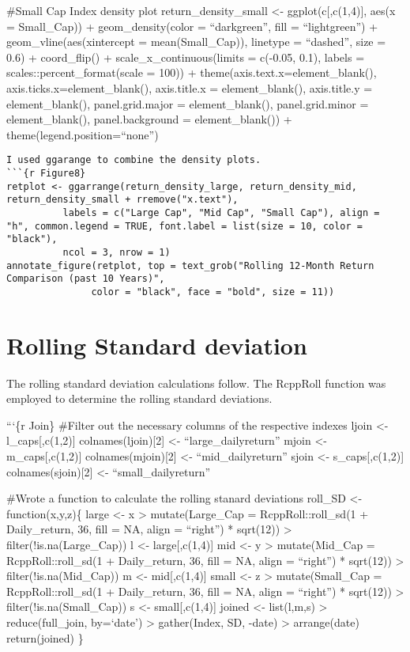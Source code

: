 \documentclass[
]{article}
\begin{document}
\#Small Cap Index density plot return\_density\_small \textless-
ggplot(c{[},c(1,4){]}, aes(x = Small\_Cap)) + geom\_density(color =
``darkgreen'', fill = ``lightgreen'') + geom\_vline(aes(xintercept =
mean(Small\_Cap)), linetype = ``dashed'', size = 0.6) + coord\_flip() +
scale\_x\_continuous(limits = c(-0.05, 0.1), labels =
scales::percent\_format(scale = 100)) +
theme(axis.text.x=element\_blank(), axis.ticks.x=element\_blank(),
axis.title.x = element\_blank(), axis.title.y = element\_blank(),
panel.grid.major = element\_blank(), panel.grid.minor =
element\_blank(), panel.background = element\_blank()) +
theme(legend.position=``none'')

\begin{verbatim}
I used ggarange to combine the density plots. 
```{r Figure8}
retplot <- ggarrange(return_density_large, return_density_mid, return_density_small + rremove("x.text"), 
          labels = c("Large Cap", "Mid Cap", "Small Cap"), align = "h", common.legend = TRUE, font.label = list(size = 10, color = "black"),
          ncol = 3, nrow = 1)
annotate_figure(retplot, top = text_grob("Rolling 12-Month Return Comparison (past 10 Years)", 
               color = "black", face = "bold", size = 11))
\end{verbatim}

\hypertarget{rolling-standard-deviation}{%
\section{Rolling Standard deviation}\label{rolling-standard-deviation}}

The rolling standard deviation calculations follow. The RcppRoll
function was employed to determine the rolling standard deviations.

```\{r Join\} \#Filter out the necessary columns of the respective
indexes ljoin \textless- l\_caps{[},c(1,2){]} colnames(ljoin){[}2{]}
\textless- ``large\_dailyreturn'' mjoin \textless- m\_caps{[},c(1,2){]}
colnames(mjoin){[}2{]} \textless- ``mid\_dailyreturn'' sjoin \textless-
s\_caps{[},c(1,2){]} colnames(sjoin){[}2{]} \textless-
``small\_dailyreturn''

\#Wrote a function to calculate the rolling stanard deviations roll\_SD
\textless- function(x,y,z)\{ large \textless- x \textbar\textgreater{}
mutate(Large\_Cap = RcppRoll::roll\_sd(1 + Daily\_return, 36, fill = NA,
align = ``right'') * sqrt(12)) \textbar\textgreater{}
filter(!is.na(Large\_Cap)) l \textless- large{[},c(1,4){]} mid
\textless- y \textbar\textgreater{} mutate(Mid\_Cap =
RcppRoll::roll\_sd(1 + Daily\_return, 36, fill = NA, align = ``right'')
* sqrt(12)) \textbar\textgreater{} filter(!is.na(Mid\_Cap)) m \textless-
mid{[},c(1,4){]} small \textless- z \textbar\textgreater{}
mutate(Small\_Cap = RcppRoll::roll\_sd(1 + Daily\_return, 36, fill = NA,
align = ``right'') * sqrt(12)) \textbar\textgreater{}
filter(!is.na(Small\_Cap)) s \textless- small{[},c(1,4){]} joined
\textless- list(l,m,s) \textbar\textgreater{} reduce(full\_join,
by=`date') \textbar\textgreater{} gather(Index, SD, -date)
\textbar\textgreater{} arrange(date) return(joined) \}
\end{document}
